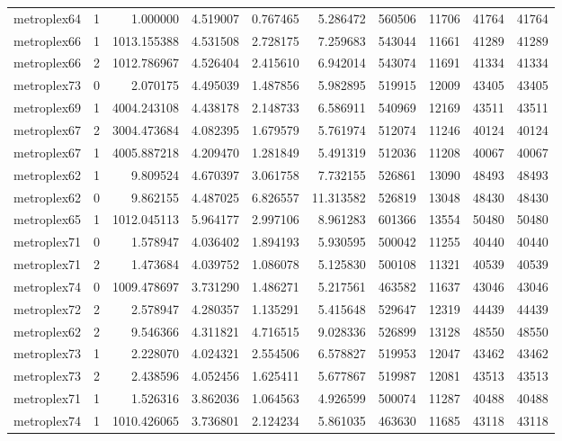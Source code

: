 \begin{longtable}{|l|r|r|r|r|r|r|r|r|r|}
metroplex64 & 1 & 1.000000 & 4.519007 & 0.767465 & 5.286472 & 560506 & 11706 & 41764 & 41764 \\
metroplex66 & 1 & 1013.155388 & 4.531508 & 2.728175 & 7.259683 & 543044 & 11661 & 41289 & 41289 \\
metroplex66 & 2 & 1012.786967 & 4.526404 & 2.415610 & 6.942014 & 543074 & 11691 & 41334 & 41334 \\
metroplex73 & 0 & 2.070175 & 4.495039 & 1.487856 & 5.982895 & 519915 & 12009 & 43405 & 43405 \\
metroplex69 & 1 & 4004.243108 & 4.438178 & 2.148733 & 6.586911 & 540969 & 12169 & 43511 & 43511 \\
metroplex67 & 2 & 3004.473684 & 4.082395 & 1.679579 & 5.761974 & 512074 & 11246 & 40124 & 40124 \\
metroplex67 & 1 & 4005.887218 & 4.209470 & 1.281849 & 5.491319 & 512036 & 11208 & 40067 & 40067 \\
metroplex62 & 1 & 9.809524 & 4.670397 & 3.061758 & 7.732155 & 526861 & 13090 & 48493 & 48493 \\
metroplex62 & 0 & 9.862155 & 4.487025 & 6.826557 & 11.313582 & 526819 & 13048 & 48430 & 48430 \\
metroplex65 & 1 & 1012.045113 & 5.964177 & 2.997106 & 8.961283 & 601366 & 13554 & 50480 & 50480 \\
metroplex71 & 0 & 1.578947 & 4.036402 & 1.894193 & 5.930595 & 500042 & 11255 & 40440 & 40440 \\
metroplex71 & 2 & 1.473684 & 4.039752 & 1.086078 & 5.125830 & 500108 & 11321 & 40539 & 40539 \\
metroplex74 & 0 & 1009.478697 & 3.731290 & 1.486271 & 5.217561 & 463582 & 11637 & 43046 & 43046 \\
metroplex72 & 2 & 2.578947 & 4.280357 & 1.135291 & 5.415648 & 529647 & 12319 & 44439 & 44439 \\
metroplex62 & 2 & 9.546366 & 4.311821 & 4.716515 & 9.028336 & 526899 & 13128 & 48550 & 48550 \\
metroplex73 & 1 & 2.228070 & 4.024321 & 2.554506 & 6.578827 & 519953 & 12047 & 43462 & 43462 \\
metroplex73 & 2 & 2.438596 & 4.052456 & 1.625411 & 5.677867 & 519987 & 12081 & 43513 & 43513 \\
metroplex71 & 1 & 1.526316 & 3.862036 & 1.064563 & 4.926599 & 500074 & 11287 & 40488 & 40488 \\
metroplex74 & 1 & 1010.426065 & 3.736801 & 2.124234 & 5.861035 & 463630 & 11685 & 43118 & 43118 \\

\end{longtable}
